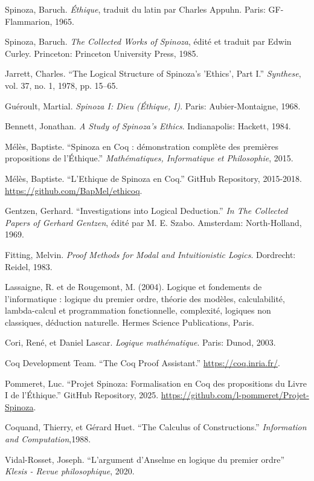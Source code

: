 \documentclass[10pt,a3paper]{article}
\begin{document}
\begin{thebibliography}{99}

Spinoza, Baruch.
\textit{Éthique}, traduit du latin par Charles Appuhn.
Paris: GF-Flammarion, 1965.

Spinoza, Baruch.
\textit{The Collected Works of Spinoza}, édité et traduit par Edwin Curley.
Princeton: Princeton University Press, 1985.

Jarrett, Charles.
``The Logical Structure of Spinoza's 'Ethics', Part I.''
\textit{Synthese}, vol. 37, no. 1, 1978, pp. 15--65.

Guéroult, Martial.
\textit{Spinoza I: Dieu (Éthique, I)}.
Paris: Aubier-Montaigne, 1968.

Bennett, Jonathan.
\textit{A Study of Spinoza's Ethics}.
Indianapolis: Hackett, 1984.

Mélès, Baptiste.
``Spinoza en Coq : démonstration complète des premières propositions de l’Éthique.''
\textit{Mathématiques, Informatique et Philosophie}, 2015.

Mélès, Baptiste.
``L'Ethique de Spinoza en Coq.'' GitHub Repository, 2015-2018.
\url{https://github.com/BapMel/ethicoq}.

Gentzen, Gerhard.
``Investigations into Logical Deduction.''
\textit{In The Collected Papers of Gerhard Gentzen}, édité par M. E. Szabo.
Amsterdam: North-Holland, 1969.

Fitting, Melvin.
\textit{Proof Methods for Modal and Intuitionistic Logics}.
Dordrecht: Reidel, 1983.

Lassaigne, R. et de Rougemont, M. (2004). Logique et fondements de l'informatique : logique du premier ordre, théorie des modèles, calculabilité, lambda-calcul et programmation fonctionnelle, complexité, logiques non classiques, déduction naturelle. Hermes Science Publications, Paris.

Cori, René, et Daniel Lascar.
\textit{Logique mathématique}.
Paris: Dunod, 2003.

Coq Development Team.
``The Coq Proof Assistant.''
\url{https://coq.inria.fr/}.

Pommeret, Luc.
``Projet Spinoza: Formalisation en Coq des propositions du Livre I de l'Éthique.'' GitHub Repository, 2025.
\url{https://github.com/l-pommeret/Projet-Spinoza}.

Coquand, Thierry, et Gérard Huet.
``The Calculus of Constructions.''
\textit{Information and Computation},1988.

Vidal-Rosset, Joseph.
``L’argument d’Anselme en logique du premier ordre''
\textit{Klesis - Revue philosophique}, 2020.

\end{thebibliography}
\end{document}
